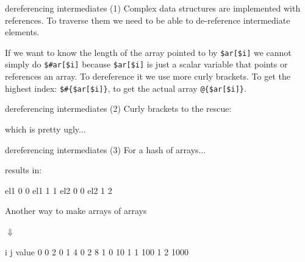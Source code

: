 \documentclass[pdf]{beamer}
\begin{document}
\begin{frame}[fragile]{dereferencing intermediates (1)}
  Complex data structures are implemented with references. To traverse them we
  need to be able to de-reference intermediate elements.
  
  \small If we want to know the length of the  array pointed to by \verb|$ar[$i]| we
  cannot simply do \verb|$#ar[$i]| because \verb|$ar[$i]| is just a scalar
  variable that points or references an array. To dereference it we use more
  curly brackets. To get the highest index: \verb|$#{$ar[$i]}|, to get the
  actual array \verb|@{$ar[$i]}|.
\end{frame}

\begin{frame}[fragile]{dereferencing intermediates (2)}
  Curly brackets to the rescue:
  which is pretty ugly...
\end{frame}

\begin{frame}[fragile]{dereferencing intermediates (3)}
  For a hash of arrays...

  results in:
  \begin{consolecode}
  el1     0       0
  el1     1       1
  el2     0       0
  el2     1       2
  \end{consolecode}
\end{frame}

\begin{frame}[fragile]{Another way to make arrays of arrays}

  \hspace{1cm} $\Downarrow$

  \begin{consolecode}
  i  j  value
  0  0  2
  0  1  4
  0  2  8
  1  0  10
  1  1  100
  1  2  1000
  \end{consolecode}

\end{frame}
\end{document}

